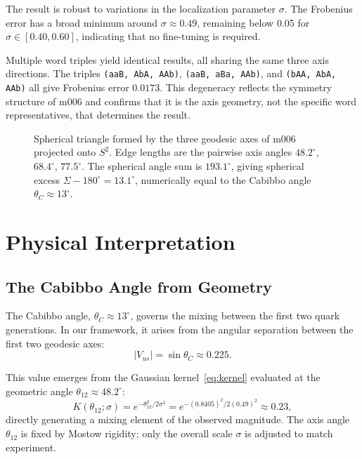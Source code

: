 \documentclass[11pt,a4paper]{article}
\begin{document}
The result is robust to variations in the localization parameter $\sigma$.
The Frobenius error has a broad minimum around $\sigma \approx 0.49$,
remaining below 0.05 for $\sigma \in [0.40, 0.60]$,
indicating that no fine-tuning is required.

Multiple word triples yield identical results, all sharing the 
same three axis directions. The triples \texttt{(aaB, AbA, AAb)}, 
\texttt{(aaB, aBa, AAb)}, and \texttt{(bAA, AbA, AAb)} all give 
Frobenius error $0.0173$. This degeneracy reflects the symmetry
structure of m006 and confirms that it is the axis geometry,
not the specific word representatives, that determines the result.

\begin{figure}[h]
\centering
\caption{Spherical triangle formed by the three geodesic axes of m006
projected onto $S^2$. Edge lengths are the pairwise axis angles
$48.2^\circ$, $68.4^\circ$, $77.5^\circ$. The spherical angle sum
is $193.1^\circ$, giving spherical excess $\Sigma - 180^\circ = 13.1^\circ$,
numerically equal to the Cabibbo angle $\theta_C \approx 13^\circ$.}
\label{fig:triangle}
\end{figure}

\section{Physical Interpretation}
\label{sec:physics}

\subsection{The Cabibbo Angle from Geometry}
\label{subsec:cabibbo}

The Cabibbo angle, $\theta_C \approx 13^\circ$, governs the mixing between 
the first two quark generations. In our framework, it arises from the 
angular separation between the first two geodesic axes:
\begin{equation}
|V_{us}| = \sin\theta_C \approx 0.225.
\end{equation}

This value emerges from the Gaussian kernel~\eqref{eq:kernel}
evaluated at the geometric angle $\theta_{12} \approx 48.2^\circ$:
\begin{equation}
K(\theta_{12};\sigma) = e^{-\theta_{12}^2/2\sigma^2}
= e^{-(0.8405)^2/2(0.49)^2} \approx 0.23,
\end{equation}
directly generating a mixing element of the observed magnitude.
The axis angle $\theta_{12}$ is fixed by Mostow rigidity; only
the overall scale $\sigma$ is adjusted to match experiment.
\end{document}
